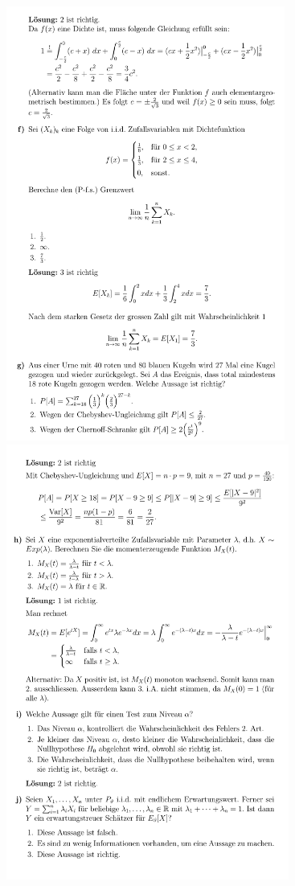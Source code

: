 \includegraphics[height=143mm]{old_exams_prtsrc/tei_infk_so17_ml-05.png}\newline
\includegraphics[height=143mm]{old_exams_prtsrc/tei_infk_so17_ml-06.png}\newline
